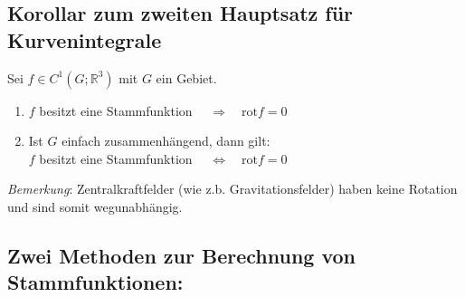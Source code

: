 \documentclass[11pt,a4paper]{book}
\newcommand {\R}	{\mathbb{R}}
\newcommand{\1}    	{\mathbbm{1}}
\newcommand{\Bemerkung}	{\noindent\textit{Bemerkung}: }
\begin{document}
\subsection{Korollar zum zweiten Hauptsatz für Kurvenintegrale}
Sei \(f \in C^1(G;\R^3)\) mit \(G\) ein Gebiet.
\begin{enumerate}
	\item \(f\) besitzt eine Stammfunktion \(\quad\Rightarrow\quad \textrm{rot} f = 0\) 
	\item Ist \(G\) einfach zusammenhängend, dann gilt:\\
	\(f\) besitzt eine Stammfunktion \(\quad\Leftrightarrow\quad \textrm{rot} f = 0\)
\end{enumerate}


\Bemerkung Zentralkraftfelder (wie z.b. Gravitationsfelder) haben keine Rotation und sind somit wegunabhängig.

\subsection*{Zwei Methoden zur Berechnung von Stammfunktionen:}
\end{document}
